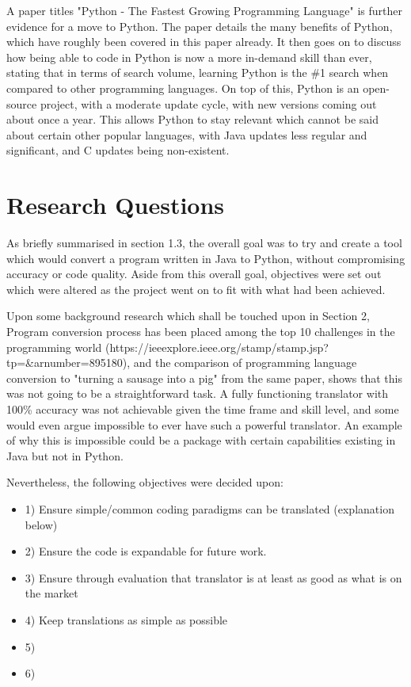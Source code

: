 \documentclass{l4proj}
\begin{document}
A paper titles "Python - The Fastest Growing Programming Language" is further evidence for a move to Python. The paper details the many benefits of Python, which have roughly been covered in this paper already. It then goes on to discuss how being able to code in Python is now a more in-demand skill than ever, stating that in terms of search volume, learning Python is the \#1 search when compared to other programming languages. On top of this, Python is an open-source project, with a moderate update cycle, with new versions coming out about once a year. This allows Python to stay relevant which cannot be said about certain other popular languages, with Java updates less regular and significant, and C updates being non-existent.

\section{Research Questions}
As briefly summarised in section 1.3, the overall goal was to try and create a tool which would convert a program written in Java to Python, without compromising accuracy or code quality. Aside from this overall goal, objectives were set out which were altered as the project went on to fit with what had been achieved. 

Upon some background research which shall be touched upon in Section 2,  Program conversion process has been placed  among  the  top  10  challenges  in  the  programming  world (https://ieeexplore.ieee.org/stamp/stamp.jsp?tp=&arnumber=895180), and the comparison of programming language conversion to "turning a sausage into a pig" from the same paper, shows that this was not going to be a straightforward task. A fully functioning translator with 100\% accuracy was not achievable given the time frame and skill level, and some would even argue impossible to ever have such a powerful translator. An example of why this is impossible could be a package with certain capabilities existing in Java but not in Python.

Nevertheless, the following objectives were decided upon:
\begin{itemize}
    \item
    1) Ensure simple/common coding paradigms can be translated (explanation below)
    \item
    2) Ensure the code is expandable for future work.
    \item
    3) Ensure through evaluation that translator is at least as good as what is on the market
    \item
    4) Keep translations as simple as possible 
    \item
    5)
    \item
    6)
\end{itemize}
\end{document}
